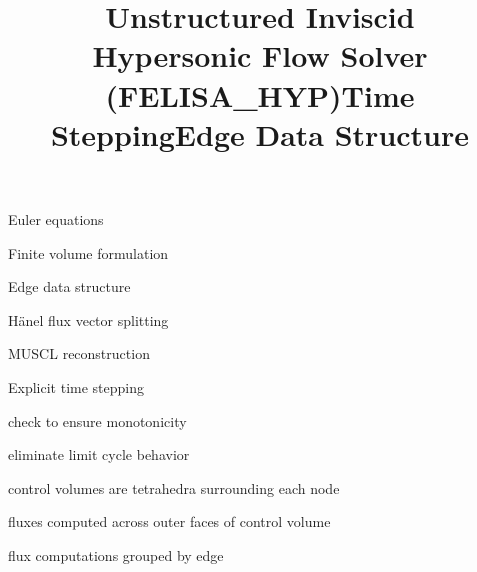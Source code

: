 \documentclass[landscape]{slides}
\begin{document}
\begin{slide}

  \title{Unstructured Inviscid\\ Hypersonic Flow Solver\\ (FELISA\_HYP)}
  \leftmargin 3in
  \begin{items}
    \item Euler equations
    \item Finite volume formulation
    \item Edge data structure
    \item H\"{a}nel flux vector splitting
    \item MUSCL reconstruction
    \item Explicit time stepping
  \end{items}
\end{slide}

\begin{note}
  \title{Time Stepping}
  \leftmargin 2.5in
  \begin{items}
    \item check to ensure monotonicity
    \item eliminate limit cycle behavior
  \end{items}
\end{note}

\begin{slide}
  \title{Edge Data Structure}
  \begin{center}
    \begin{minipage}{.45\linewidth}
    \end{minipage}
    \hspace{0.05\linewidth}
    \begin{minipage}{.45\linewidth}
      \begin{items}
        \item control volumes are tetrahedra surrounding each node
        \item fluxes computed across outer faces of control volume
        \item flux computations grouped by edge
      \end{items}
    \end{minipage}
  \end{center}
\end{slide}
\end{document}
